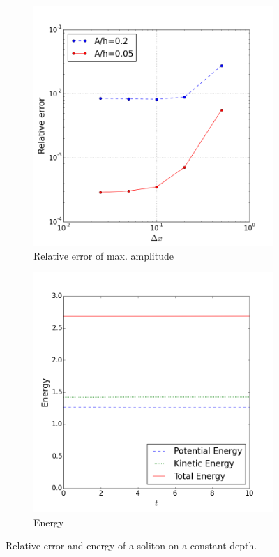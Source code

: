 \documentclass[review]{elsarticle}
\begin{document}
\begin{figure}[!htb]
    \centering
    \begin{subfigure}[b]{0.45\textwidth}
        \includegraphics[width=\textwidth]{_fig/soliton_error.png}
        \caption{Relative error of max. amplitude}
        \label{fig:soliton_error}
    \end{subfigure}
    \begin{subfigure}[b]{0.45\textwidth}
        \includegraphics[width=\textwidth]{_fig/soliton_energy.png}
        \caption{Energy}
        \label{fig:soliton_energy}
    \end{subfigure}
    \caption{Relative error and energy of a soliton on a constant depth.}
    \label{fig:soliton_error_energy}
\end{figure}
\end{document}
